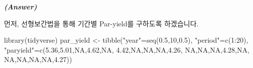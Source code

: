 \documentclass[
  a4paper,
  DIV=11,
  numbers=noendperiod]{scrreprt}
\newenvironment{Shaded}{\begin{snugshade}}{\end{snugshade}}
\newcommand{\ConstantTok}[1]{\textcolor[rgb]{0.56,0.35,0.01}{#1}}
\newcommand{\DecValTok}[1]{\textcolor[rgb]{0.68,0.00,0.00}{#1}}
\newcommand{\FloatTok}[1]{\textcolor[rgb]{0.68,0.00,0.00}{#1}}
\newcommand{\FunctionTok}[1]{\textcolor[rgb]{0.28,0.35,0.67}{#1}}
\newcommand{\NormalTok}[1]{\textcolor[rgb]{0.00,0.23,0.31}{#1}}
\newcommand{\OtherTok}[1]{\textcolor[rgb]{0.00,0.23,0.31}{#1}}
\newcommand{\SpecialCharTok}[1]{\textcolor[rgb]{0.37,0.37,0.37}{#1}}
\newcommand{\StringTok}[1]{\textcolor[rgb]{0.13,0.47,0.30}{#1}}
\begin{document}
\textbf{\emph{(Answer)}}

먼저, 선형보간법을 통해 기간별 Par-yield를 구하도록 하겠습니다.

\begin{Shaded}
\begin{Highlighting}[]
\FunctionTok{library}\NormalTok{(tidyverse)}
\NormalTok{par\_yield }\OtherTok{\textless{}{-}} \FunctionTok{tibble}\NormalTok{(}\StringTok{"year"}\OtherTok{=}\FunctionTok{seq}\NormalTok{(}\FloatTok{0.5}\NormalTok{,}\DecValTok{10}\NormalTok{,}\FloatTok{0.5}\NormalTok{),}
                    \StringTok{"period"}\OtherTok{=}\FunctionTok{c}\NormalTok{(}\DecValTok{1}\SpecialCharTok{:}\DecValTok{20}\NormalTok{),}
                    \StringTok{"paryield"}\OtherTok{=}\FunctionTok{c}\NormalTok{(}\FloatTok{5.36}\NormalTok{,}\FloatTok{5.01}\NormalTok{,}\ConstantTok{NA}\NormalTok{,}\FloatTok{4.62}\NormalTok{,}\ConstantTok{NA}\NormalTok{,}
                                 \FloatTok{4.42}\NormalTok{,}\ConstantTok{NA}\NormalTok{,}\ConstantTok{NA}\NormalTok{,}\ConstantTok{NA}\NormalTok{,}\FloatTok{4.26}\NormalTok{,}
                                \ConstantTok{NA}\NormalTok{,}\ConstantTok{NA}\NormalTok{,}\ConstantTok{NA}\NormalTok{,}\FloatTok{4.28}\NormalTok{,}\ConstantTok{NA}\NormalTok{,}
                                \ConstantTok{NA}\NormalTok{,}\ConstantTok{NA}\NormalTok{,}\ConstantTok{NA}\NormalTok{,}\ConstantTok{NA}\NormalTok{,}\FloatTok{4.27}\NormalTok{))}
\end{Highlighting}
\end{Shaded}
\end{document}
